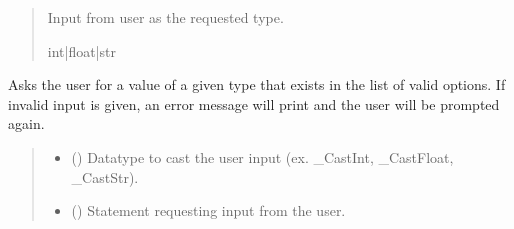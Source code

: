 \documentclass[letterpaper,10pt,english]{sphinxmanual}
\begin{document}
\begin{fulllineitems}
\begin{fulllineitems}
\begin{quote}
\begin{description}
\begin{itemize}
\end{itemize}

\sphinxAtStartPar
Input from user as the requested type.

\sphinxAtStartPar
int|float|str

\end{description}\end{quote}

\end{fulllineitems}


\begin{fulllineitems}
\label{\detokenize{GetUserInput:GetUserInput.UserInput.AskForTypeInList}}
\pysigstartsignatures
{}
\pysigstopsignatures
\sphinxAtStartPar
Asks the user for a value of a given type that exists in the list of valid options.  If invalid         input is given, an error message will print and the user will be prompted again.
\begin{quote}\begin{description}
\begin{itemize}
\item {} 
\sphinxAtStartPar
{} () \textendash{} Datatype to cast the user input (ex. \_CastInt, \_CastFloat, \_CastStr).

\item {} 
\sphinxAtStartPar
{} () \textendash{} Statement requesting input from the user.


\end{itemize}
\end{description}
\end{quote}
\end{fulllineitems}
\end{fulllineitems}
\end{document}
